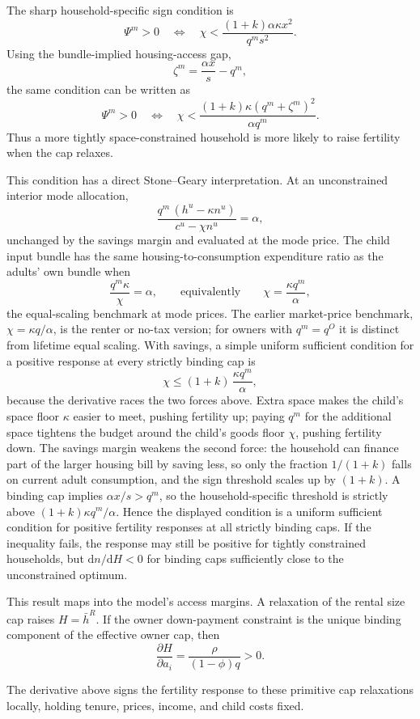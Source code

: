 \documentclass[11pt]{article}
\newcommand{\dd}{\mathrm d}
\newcommand{\1}{\mathbf 1}
\begin{document}
The sharp household-specific sign condition is
\[
\Psi^m>0
\quad\Longleftrightarrow\quad
\chi<
\frac{(1+k)\alpha\kappa x^2}{q^m s^2}.
\]
Using the bundle-implied housing-access gap,
\[
\zeta^m=\frac{\alpha x}{s}-q^m,
\]
the same condition can be written as
\[
\Psi^m>0
\quad\Longleftrightarrow\quad
\chi<
\frac{(1+k)\kappa(q^m+\zeta^m)^2}{\alpha q^m}.
\]
Thus a more tightly space-constrained household is more likely to raise fertility when the cap relaxes.

This condition has a direct Stone--Geary interpretation. At an unconstrained interior mode allocation,
\[
\frac{q^m\,(h^u-\kappa n^u)}{c^u-\chi n^u}=\alpha,
\]
unchanged by the savings margin and evaluated at the mode price. The child input bundle has the same housing-to-consumption expenditure ratio as the adults' own bundle when
\[
\frac{q^m\kappa}{\chi}=\alpha,
\qquad\text{equivalently}\qquad
\chi=\frac{\kappa q^m}{\alpha},
\]
the equal-scaling benchmark at mode prices. The earlier market-price benchmark, $\chi=\kappa q/\alpha$, is the renter or no-tax version; for owners with $q^m=q^O$ it is distinct from lifetime equal scaling. With savings, a simple uniform sufficient condition for a positive response at every strictly binding cap is
\[
\chi\le (1+k)\,\frac{\kappa q^m}{\alpha},
\]
because the derivative races the two forces above. Extra space makes the child's space floor $\kappa$ easier to meet, pushing fertility up; paying $q^m$ for the additional space tightens the budget around the child's goods floor $\chi$, pushing fertility down. The savings margin weakens the second force: the household can finance part of the larger housing bill by saving less, so only the fraction $1/(1+k)$ falls on current adult consumption, and the sign threshold scales up by $(1+k)$. A binding cap implies $\alpha x/s>q^m$, so the household-specific threshold is strictly above $(1+k)\kappa q^m/\alpha$. Hence the displayed condition is a uniform sufficient condition for positive fertility responses at all strictly binding caps. If the inequality fails, the response may still be positive for tightly constrained households, but $\dd n/\dd H<0$ for binding caps sufficiently close to the unconstrained optimum.

This result maps into the model's access margins. A relaxation of the rental size cap raises $H=\bar h^R$. If the owner down-payment constraint is the unique binding component of the effective owner cap, then
\[
\frac{\partial H}{\partial a_i}
=
\frac{\rho}{(1-\phi)q}>0.
\]

The derivative above signs the fertility response to these primitive cap relaxations locally, holding tenure, prices, income, and child costs fixed.
\end{document}
